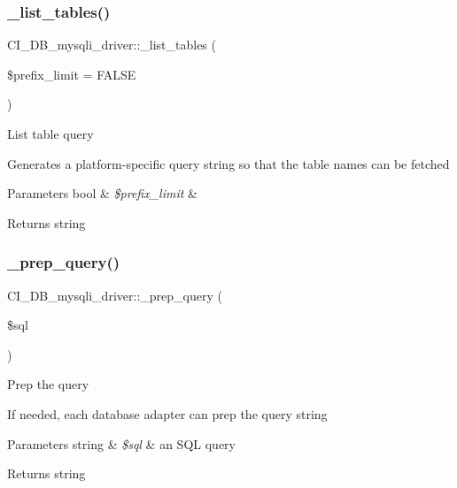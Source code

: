 \subsubsection{\texorpdfstring{\+\_\+list\+\_\+tables()}{\_list\_tables()}}
{\footnotesize\ttfamily C\+I\+\_\+\+D\+B\+\_\+mysqli\+\_\+driver\+::\+\_\+list\+\_\+tables (\begin{DoxyParamCaption}\item[{}]{\$prefix\+\_\+limit = {\ttfamily FALSE} }\end{DoxyParamCaption})\hspace{0.3cm}{\ttfamily [protected]}}

List table query

Generates a platform-\/specific query string so that the table names can be fetched


\begin{DoxyParams}[1]{Parameters}
bool & {\em \$prefix\+\_\+limit} & \\
\hline
\end{DoxyParams}
\begin{DoxyReturn}{Returns}
string 
\end{DoxyReturn}
\mbox{\label{class_c_i___d_b__mysqli__driver_ab187215fd7c35d9a3a0ac89d4132add0}} 
\subsubsection{\texorpdfstring{\+\_\+prep\+\_\+query()}{\_prep\_query()}}
{\footnotesize\ttfamily C\+I\+\_\+\+D\+B\+\_\+mysqli\+\_\+driver\+::\+\_\+prep\+\_\+query (\begin{DoxyParamCaption}\item[{}]{\$sql }\end{DoxyParamCaption})\hspace{0.3cm}{\ttfamily [protected]}}

Prep the query

If needed, each database adapter can prep the query string


\begin{DoxyParams}[1]{Parameters}
string & {\em \$sql} & an S\+QL query \\
\hline
\end{DoxyParams}
\begin{DoxyReturn}{Returns}
string 
\end{DoxyReturn}
\mbox{\label{class_c_i___d_b__mysqli__driver_ac271a30b7f4a06d9633ef66d43ae54d1}} 
